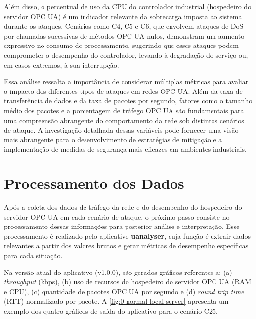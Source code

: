     Além disso, o percentual de uso da CPU do controlador industrial (hospedeiro do servidor OPC UA) é um indicador relevante da sobrecarga imposta ao sistema durante os ataques. Cenários como C4, C5 e C6, que envolvem ataques de DoS por chamadas sucessivas de métodos OPC UA nulos, demonstram um aumento expressivo no consumo de processamento, sugerindo que esses ataques podem comprometer o desempenho do controlador, levando à degradação do serviço ou, em casos extremos, à sua interrupção.

    Essa análise ressalta a importância de considerar múltiplas métricas para avaliar o impacto dos diferentes tipos de ataques em redes OPC UA. Além da taxa de transferência de dados e da taxa de pacotes por segundo, fatores como o tamanho médio dos pacotes e a porcentagem de tráfego OPC UA são fundamentais para uma compreensão abrangente do comportamento da rede sob distintos cenários de ataque. A investigação detalhada dessas variáveis pode fornecer uma visão mais abrangente para o desenvolvimento de estratégias de mitigação e a implementação de medidas de segurança mais eficazes em ambientes industriais.

\section{Processamento dos Dados} \label{sec:processamento-dados}

    Após a coleta dos dados de tráfego da rede e do desempenho do hospedeiro do servidor OPC UA em cada cenário de ataque, o próximo passo consiste no processamento dessas informações para posterior análise e interpretação. Esse processamento é realizado pelo aplicativo \textbf{uanalyser}, cuja função é extrair dados relevantes a partir dos valores brutos e gerar métricas de desempenho específicas para cada situação.

    Na versão atual do aplicativo (v1.0.0), são gerados gráficos referentes a: (a) \textit{throughput} (kbps), (b) uso de recursos do hospedeiro do servidor OPC UA (RAM e CPU), (c) quantidade de pacotes OPC UA por segundo e (d) \textit{round trip time} (RTT) normalizado por pacote. A \autoref{fig:0-normal-local-server} apresenta um exemplo dos quatro gráficos de saída do aplicativo para o cenário C25.

